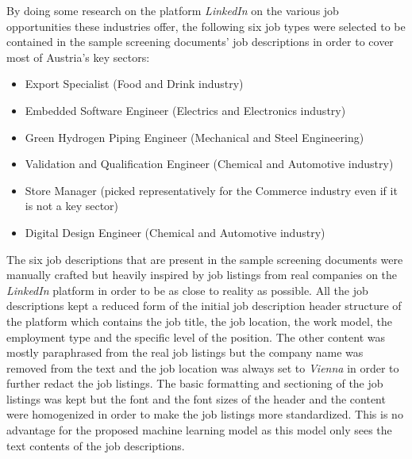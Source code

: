 \documentclass[draft,final]{thesisclass} %
\begin{document}
By doing some research on the platform \textit{LinkedIn} \parencite{linkedin} on the various job opportunities these industries offer, the following six job types were selected to be contained in the sample screening documents' job descriptions in order to cover most of Austria's key sectors:
\begin{itemize}
    \item Export Specialist (Food and Drink industry)
    \item Embedded Software Engineer (Electrics and Electronics industry)
    \item Green Hydrogen Piping Engineer (Mechanical and Steel Engineering)
    \item Validation and Qualification Engineer (Chemical and Automotive industry)
    \item Store Manager (picked representatively for the Commerce industry even if it is not a key sector)
    \item Digital Design Engineer (Chemical and Automotive industry)
\end{itemize}
The six job descriptions that are present in the sample screening documents were manually crafted but heavily inspired by job listings from real companies on the \textit{LinkedIn} platform in order to be as close to reality as possible.
All the job descriptions kept a reduced form of the initial job description header structure of the platform which contains the job title, the job location, the work model, the employment type and the specific level of the position.
The other content was mostly paraphrased from the real job listings but the company name was removed from the text and the job location was always set to \textit{Vienna} in order to further redact the job listings.
The basic formatting and sectioning of the job listings was kept but the font and the font sizes of the header and the content were homogenized in order to make the job listings more standardized.
This is no advantage for the proposed machine learning model as this model only sees the text contents of the job descriptions.
\end{document}
